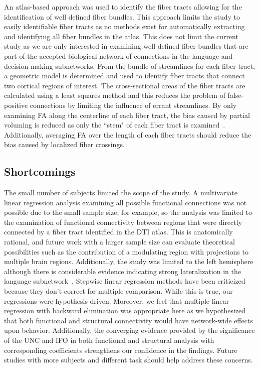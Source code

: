 \documentclass[final,authoryear,5p,times,twocolumn]{elsarticle}
\begin{document}
An atlas-based approach was used to identify the fiber tracts allowing for the identification of well defined fiber bundles. This approach limits the study to easily identifiable fiber tracts as no methods exist for automatically extracting and identifying all fiber bundles in the atlas. This does not limit the current study as we are only interested in examining well defined fiber bundles that are part of the accepted biological network of connections in the language and decision-making subnetworks. From the bundle of streamlines for each fiber tract, a geometric model is determined and used to identify fiber tracts that connect two cortical regions of interest. The cross-sectional areas of the fiber tracts are calculated using a least squares method and this reduces the problem of false-positive connections by limiting the influence of errant streamlines. By only examining FA along the centerline of each fiber tract, the bias caused by partial voluming is reduced as only the ``stem" of each fiber tract is examined~\cite{Smith2006,Yushkevich2008}. Additionally, averaging FA over the length of each fiber tracts should reduce the bias caused by localized fiber crossings.

\subsection{Shortcomings}
The small number of subjects limited the scope of the study. A multivariate linear regression analysis examining all possible functional connections was not possible due to the small sample size, for example, so the analysis was limited to the examination of functional connectivity between regions that were directly connected by a fiber tract identified in the DTI atlas.  This is anatomically rational, and future work with a larger sample size can evaluate theoretical possibilities such as the contribution of a modulating region with projections to multiple brain regions. Additionally, the study was limited to the left hemisphere although there is considerable evidence indicating strong lateralization in the language subnetwork~\cite{Catani2007,Powell2006,Putnam2008,Propper2010}. Stepwise linear regression methods have been criticized because they don't correct for multiple comparison. While this is true, our regressions were hypothesis-driven.  Moreover, we feel that multiple linear regression with backward elimination was appropriate here as we hypothesized that both functional and structural connectivity would have network-wide effects upon behavior. Additionally, the converging evidence provided by the significance of the UNC and IFO in both functional and structural analysis with corresponding coefficients strengthens our confidence in the findings. Future studies with more subjects and different task should help address these concerns.
\end{document}
